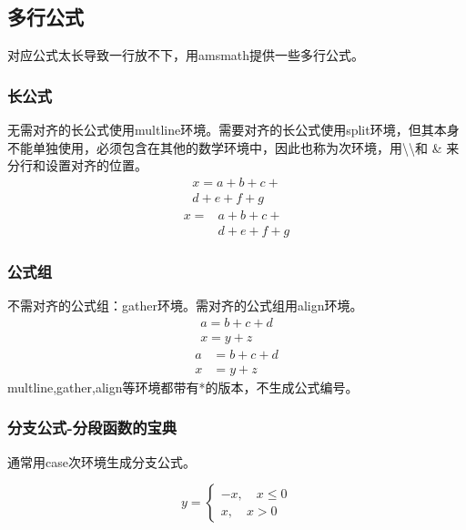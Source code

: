 \documentclass[16pt]{article}
\begin{document}
\subsection{多行公式}
    对应公式太长导致一行放不下，用amsmath提供一些多行公式。
\subsubsection{长公式}
    无需对齐的长公式使用multline环境。需要对齐的长公式使用split环境，但其本身不能单独使用，必须包含在其他的数学环境中，因此也称为次环境，用\textbackslash \textbackslash 和 \& 来分行和设置对齐的位置。
    \begin{multline}
        x = a+b+c+{} \\
        d+e+f+g
    \end{multline}
    \[
        \begin{split}
            x = {} & a+b+c+{} \\
                   & d+e+f+g
        \end{split}
        \]
    \subsubsection{公式组}
    不需对齐的公式组：gather环境。需对齐的公式组用align环境。
    \begin{gather}
        a = b+c+d \\
        x = y+z
    \end{gather}
    \begin{align}
        a  &= b+c+d \\
        x  &= y+z
    \end{align} 
    multline,gather,align等环境都带有*的版本，不生成公式编号。
\subsubsection{分支公式-分段函数的宝典}
    通常用case次环境生成分支公式。 \par
    \[
        y=
        \begin{cases}
            -x, \quad x\leq 0 \\
            x, \quad x>0
        \end{cases}
    \]
\end{document}
